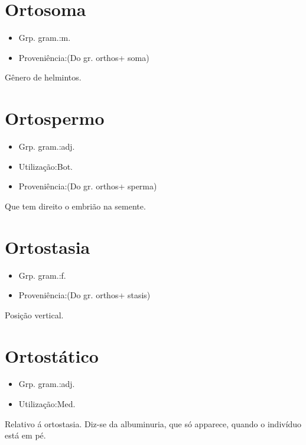 \section{Ortosoma}
\begin{itemize}
\item {Grp. gram.:m.}
\end{itemize}
\begin{itemize}
\item {Proveniência:(Do gr. \textunderscore orthos\textunderscore  + \textunderscore soma\textunderscore )}
\end{itemize}
Gênero de helmintos.
\section{Ortospermo}
\begin{itemize}
\item {Grp. gram.:adj.}
\end{itemize}
\begin{itemize}
\item {Utilização:Bot.}
\end{itemize}
\begin{itemize}
\item {Proveniência:(Do gr. \textunderscore orthos\textunderscore  + \textunderscore sperma\textunderscore )}
\end{itemize}
Que tem direito o embrião na semente.
\section{Ortostasia}
\begin{itemize}
\item {Grp. gram.:f.}
\end{itemize}
\begin{itemize}
\item {Proveniência:(Do gr. \textunderscore orthos\textunderscore  + \textunderscore stasis\textunderscore )}
\end{itemize}
Posição vertical.
\section{Ortostático}
\begin{itemize}
\item {Grp. gram.:adj.}
\end{itemize}
\begin{itemize}
\item {Utilização:Med.}
\end{itemize}
Relativo á ortostasia.
Diz-se da albuminuria, que só apparece, quando o indivíduo está em pé.
